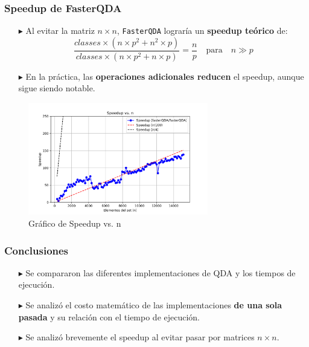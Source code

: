 \begin{frame}[fragile]
    \frametitle{Speedup de FasterQDA}
\scriptsize
    \begin{itemize}
        \item[$\blacktriangleright$]  Al evitar la matriz \(n \times n\), \texttt{FasterQDA} lograría un \textbf{speedup teórico} de:
        \[
            \frac{classes \times (n \times p^2 + n^2 \times p)}{classes \times (n \times p^2 + n \times p)} = \frac{n}{p} \quad \text{para} \quad n \gg p
        \]
        \item[$\blacktriangleright$]  En la práctica, las \textbf{operaciones adicionales reducen} el speedup, aunque sigue siendo notable.
    \end{itemize}
    \begin{figure}
        \centering
        \includegraphics[width=0.7\textwidth]{../speedup_vs_n.png} %
        \caption{Gráfico de Speedup vs. n}
    \end{figure}
\end{frame}

\begin{frame}[fragile]
    \frametitle{Conclusiones}

    \begin{itemize}
        \item[$\blacktriangleright$] Se compararon las diferentes implementaciones de QDA y los tiempos de ejecución.
        \item[$\blacktriangleright$] Se analizó el costo matemático de las implementaciones \textbf{de una sola pasada} y su relación con el tiempo de ejecución.
        \item[$\blacktriangleright$] Se analizó brevemente el speedup al evitar pasar por matrices \(n \times n\).

    \end{itemize}

\end{frame}
